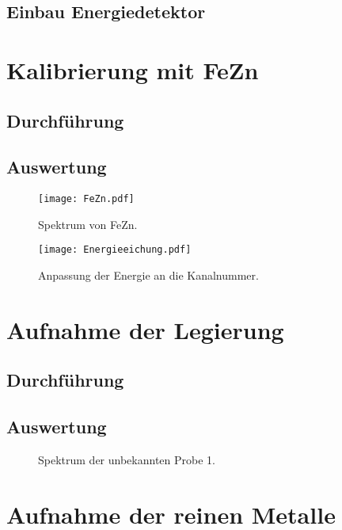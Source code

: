 \subsection{Einbau Energiedetektor}

\section{Kalibrierung mit FeZn}

\subsection{Durchführung}

\subsection{Auswertung}

\begin{figure}[htbp]
    \centering
    \texttt{[image: FeZn.pdf]}
    \caption{%
        Spektrum von FeZn.
    }
    \label{fig:FeZn}
\end{figure}

\begin{figure}[htbp]
    \centering
    \texttt{[image: Energieeichung.pdf]}
    \caption{%
        Anpassung der Energie an die Kanalnummer.
    }
    \label{fig:}
\end{figure}

\section{Aufnahme der Legierung}

\subsection{Durchführung}

\subsection{Auswertung}

\begin{figure}[htbp]
    \centering
    \caption{%
        Spektrum der unbekannten Probe 1.
    }
    \label{fig:}
\end{figure}

\section{Aufnahme der reinen Metalle}

